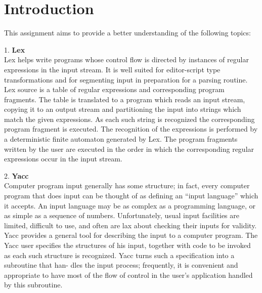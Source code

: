 \documentclass[11pt]{report}
\begin{document}
\section{Introduction}
\vspace*{1cm}
This assignment aims to provide a better understanding of the following topics:\\
\begin{flushleft}
1. \textbf{Lex}\\
Lex helps write programs whose control flow is directed by instances of regular expressions in the input stream. It is well suited for editor-script type transformations and for segmenting input in preparation for a parsing routine.
\\
Lex source is a table of regular expressions and corresponding program fragments. The table is translated to a program which reads an input stream, copying it to an output stream and partitioning the input into strings which match the given expressions. As each such string is recognized the corresponding program fragment is executed. The recognition of the expressions is performed by a deterministic finite automaton generated by Lex. The program fragments written by the user are executed in the order in which the corresponding regular expressions occur in the input stream.
\end{flushleft}

\begin{flushleft}
2. \textbf{Yacc}\\
Computer program input generally has some structure; in fact, every computer program that does input can be thought of as defining an ``input language'' which it accepts. An input language may be as complex as a programming language, or as simple as a sequence of numbers. Unfortunately, usual input facilities are limited, difficult to use, and often are lax about checking their inputs for validity.\\
Yacc provides a general tool for describing the input to a computer program. The Yacc user specifies the structures of his input, together with code to be invoked as each such structure is recognized. Yacc turns such a specification into a subroutine that han- dles the input process; frequently, it is convenient and appropriate to have most of the flow of control in the user's application handled by this subroutine.
\end{flushleft}
\newpage
\end{document}
